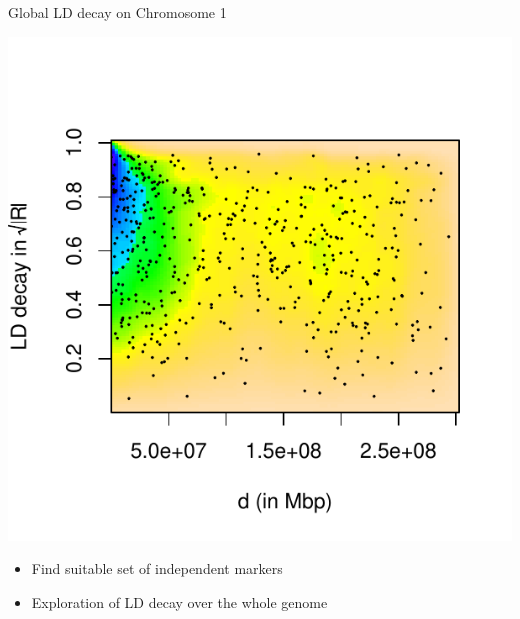 \documentclass[a0paper,portrait]{baposter}
\begin{document}
\begin{poster}
{\begin{minipage}{0.3 \textwidth}
%
\end{minipage}
%
\hspace{0.4cm}
\begin{minipage}{0.33 \textwidth}
\vspace{0.5cm}
\centering
Global LD decay on Chromosome 1
\begin{center}
\vspace{-1.5cm}
\includegraphics[width=0.8\linewidth]{SchnabelTorrettaWesthuesFigure1A}
\end{center}
\vspace{-0.2cm}
\end{minipage}
%
\hspace{0.6cm}
\begin{minipage}{0.3 \textwidth}
\begin{itemize}[leftmargin=*]
	\item Find suitable set of independent markers 
	\item Exploration of LD decay over the whole genome

\end{itemize}
\end{minipage}}
\end{poster}
\end{document}
